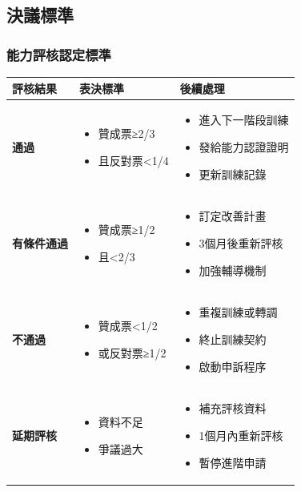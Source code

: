 \documentclass[12pt,a4paper]{article}
\begin{document}
\subsection{決議標準}
\subsubsection{能力評核認定標準}
\begin{longtable}{|>{\raggedright\arraybackslash}p{4cm}|>{\raggedright\arraybackslash}p{4cm}|>{\raggedright\arraybackslash}p{6cm}|}
\hline
\rowcolor{light_blue}
\textbf{評核結果} & \textbf{表決標準} & \textbf{後續處理} \\
\hline
\textbf{通過} &
\begin{itemize}[nosep]
\item 贊成票≥2/3
\item 且反對票<1/4
\end{itemize} &
\begin{itemize}[nosep]
\item 進入下一階段訓練
\item 發給能力認證證明
\item 更新訓練記錄
\end{itemize} \\
\hline
\textbf{有條件通過} &
\begin{itemize}[nosep]
\item 贊成票≥1/2
\item 且<2/3
\end{itemize} &
\begin{itemize}[nosep]
\item 訂定改善計畫
\item 3個月後重新評核
\item 加強輔導機制
\end{itemize} \\
\hline
\textbf{不通過} &
\begin{itemize}[nosep]
\item 贊成票<1/2
\item 或反對票≥1/2
\end{itemize} &
\begin{itemize}[nosep]
\item 重複訓練或轉調
\item 終止訓練契約
\item 啟動申訴程序
\end{itemize} \\
\hline
\textbf{延期評核} &
\begin{itemize}[nosep]
\item 資料不足
\item 爭議過大
\end{itemize} &
\begin{itemize}[nosep]
\item 補充評核資料
\item 1個月內重新評核
\item 暫停進階申請
\end{itemize} \\
\hline
\end{longtable}
\end{document}
